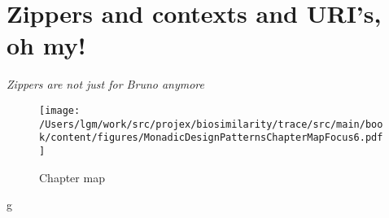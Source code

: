 

\chapter{Zippers and contexts and URI's, oh my!}
\begin{center}
{\small\em Zippers are not just for Bruno anymore}
\end{center}

\begin{figure}[tbp]
\begin{center}
{ \texttt{[image: /Users/lgm/work/src/projex/biosimilarity/trace/src/main/book/content/figures/MonadicDesignPatternsChapterMapFocus6.pdf]} }
\caption{ Chapter map }
\end{center}
\end{figure}

g








